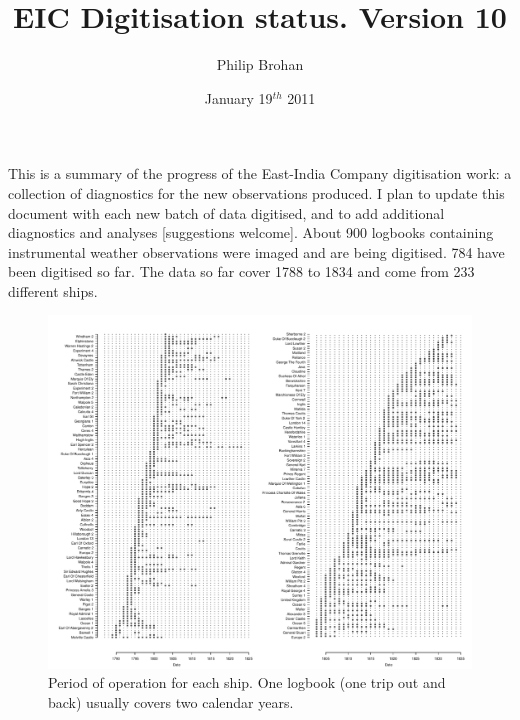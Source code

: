 \documentclass[a4paper,11pt]{article}
\title{EIC Digitisation status. Version 10}
\date{January 19$^{th}$ 2011}
\author{Philip Brohan}
\begin{document}
\maketitle

This is a summary of the progress of the East-India Company digitisation work: a collection of diagnostics for the new observations produced. I plan to update this document with each new batch of data digitised, and to add additional diagnostics and analyses [suggestions welcome]. About 900 logbooks containing instrumental weather observations were imaged and are being digitised. 784 have been digitised so far. The data so far cover 1788 to 1834 and come from 233 different ships.

\begin{figure}
\begin{center}
\includegraphics[angle=90, width=1.0\textwidth]{../ships_list/ship_years}
\caption{Period of operation for each ship. One logbook (one trip out and back) usually covers two calendar years.}
\label{ship_years}
\end{center}
\end{figure}
\end{document}

